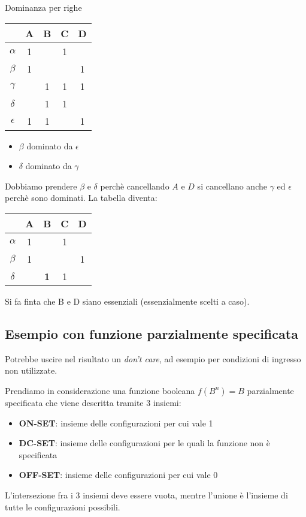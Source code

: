 \documentclass[a4paper]{article}
\theoremstyle{break}
\theoremstyle{break}
\theoremstyle{break}
\theoremstyle{break}
\begin{document}
\begin{example}
    Dominanza per righe
    \begin{center}
        \begin{tabular}{c|c|c|c|c}
            & A & B & C & D\\
            \hline 
            \( \alpha \) & 1 &  & 1 &  \\ 
            \( \beta \) & 1 &  &  & 1 \\
            \( \gamma \) &  & 1 & 1 & 1 \\
            \( \delta \) &  & 1 & 1 &  \\
            \( \epsilon \) & 1 & 1 &  & 1 \\
        \end{tabular}
    \end{center}
    \begin{itemize}
        \item \( \beta \) dominato da \( \epsilon \) 
            \item \( \delta \) dominato da \( \gamma \) 
    \end{itemize}
    Dobbiamo prendere \( \beta \) e \( \delta \) perchè cancellando \( A \) e \( D \)
    si cancellano anche \( \gamma \) ed \( \epsilon \) perchè sono dominati.  
    La tabella diventa:
    \begin{center}
               \begin{tabular}{c|c|c|c|c}
            & A & B & C & D\\
            \hline 
            \( \alpha \) & 1 & \vline & 1 &  \\ 
            \( \beta \) & 1 & \vline &  & 1  \\
             \( \delta \) &  & \textbf{1} \vline & 1 & \\
        \end{tabular}
    \end{center}
    Si fa finta che B e D siano essenziali (essenzialmente scelti a caso).
\end{example}


\subsection{Esempio con funzione parzialmente specificata}
Potrebbe uscire nel risultato un \emph{don't care}, ad esempio per condizioni di 
ingresso non utilizzate.

Prendiamo in considerazione una funzione booleana \( f(B^n)=B \) parzialmente
specificata che viene descritta tramite 3 insiemi:
\begin{itemize}
    \item \textbf{ON-SET}: insieme delle configurazioni per cui vale 1
    \item \textbf{DC-SET}: insieme delle configurazioni per le quali
        la funzione non è specificata
    \item \textbf{OFF-SET}: insieme delle configurazioni per cui vale 0
\end{itemize}
L'intersezione fra i 3 insiemi deve essere vuota, mentre l'unione è l'insieme
di tutte le configurazioni possibili.
\end{document}
